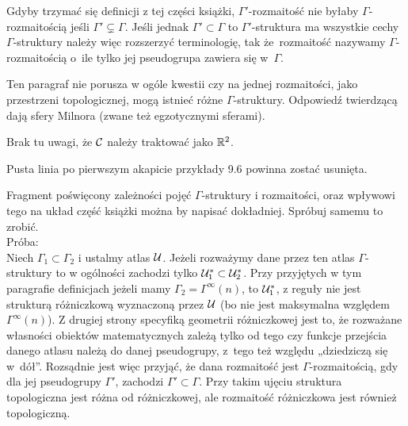 \documentclass[a4paper,11pt]{article}
\begin{document}
\vspace{\spaceFour}


\start {} Gdyby trzymać się definicji z tej części książki,
$\Gamma'$-rozmaitość nie byłaby $\Gamma$-rozmaitością
jeśli $\Gamma' \subsetneq \Gamma$. Jeśli jednak
$\Gamma' \subset \Gamma$ to $\Gamma'$-struktura ma wszystkie
cechy $\Gamma$-struktury należy więc rozszerzyć terminologię,
tak że~rozmaitość nazywamy $\Gamma$-rozmaitością o~ile tylko jej
pseudogrupa zawiera się w~$\Gamma$.

\vspace{\spaceFour}



\start {} Ten paragraf nie porusza w ogóle kwestii czy na jednej
rozmaitości, jako przestrzeni topologicznej, mogą istnieć różne
$\Gamma$-struktury. Odpowiedź twierdzącą dają sfery Milnora
(zwane też egzotycznymi sferami).

\vspace{\spaceFour}



\start {} Brak tu uwagi, że $\mathcal{C}$ należy traktować jako
$\mathbb{R}^{ 2 }$.

\vspace{\spaceFour}



\start {} Pusta linia po pierwszym akapicie przykłady 9.6
powinna zostać usunięta.

\vspace{\spaceFour}



Fragment poświęcony zależności pojęć $\Gamma$-struktury i rozmaitości,
oraz wpływowi tego na układ część książki można by napisać dokładniej.
Spróbuj samemu to zrobić. \\
Próba: \\
Niech $\Gamma_{ 1 } \subset \Gamma_{ 2 }$ i ustalmy atlas
$\mathcal{U}$. Jeżeli rozważymy dane przez ten atlas
$\Gamma$-struktury to w ogólności zachodzi tylko
$\mathcal{U}^{ * }_{ 1 } \subset \mathcal{U}^{ * }_{ 2 }$. Przy
przyjętych w tym paragrafie definicjach jeżeli mamy
$\Gamma_{ 2 } = \Gamma^{ \infty }( n )$, to
$\mathcal{U}^{ * }_{ 1 }$, z reguły nie jest strukturą różniczkową
wyznaczoną przez $\mathcal{U}$ (bo nie jest maksymalna względem
$\Gamma^{ \infty }( n )$). Z drugiej strony specyfiką geometrii
różniczkowej jest to, że rozważane własności obiektów matematycznych
zależą tylko od tego czy funkcje przejścia danego atlasu należą do
danej pseudogrupy, z~tego też względu „dziedziczą się w~dół”.
Rozsądnie jest więc przyjąć, że dana rozmaitość jest
$\Gamma$-rozmaitością, gdy dla jej pseudogrupy $\Gamma'$, zachodzi
$\Gamma' \subset \Gamma$. Przy takim ujęciu struktura topologiczna
jest różna od różniczkowej, ale rozmaitość różniczkowa
jest również topologiczną.
\end{document}
